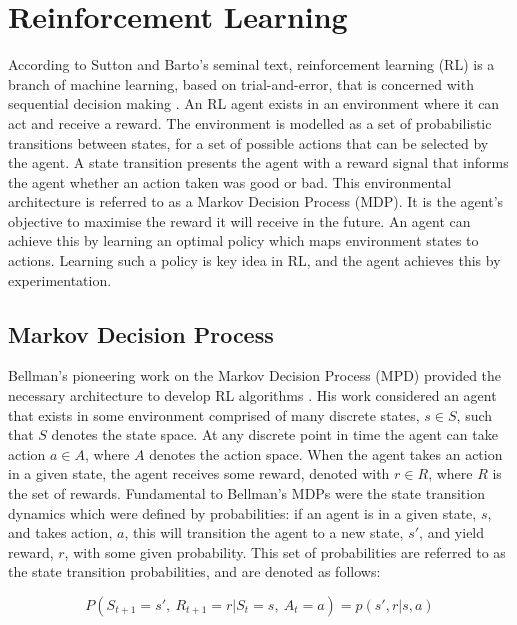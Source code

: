 \section{Reinforcement Learning}\label{rl}
According to Sutton and Barto's seminal text, reinforcement learning (RL) is a branch of machine learning, based on trial-and-error, that is concerned with sequential decision making \cite{Sutton2018}. An RL agent exists in an environment where it can act and receive a reward. The environment is modelled as a set of probabilistic transitions between states, for a set of possible actions that can be selected by the agent. A state transition presents the agent with a reward signal that informs the agent whether an action taken was good or bad. This environmental architecture is referred to as a Markov Decision Process (MDP). It is the agent's objective to maximise the reward it will receive in the future. An agent can achieve this by learning an optimal policy which maps environment states to actions. Learning such a policy is key idea in RL, and the agent achieves this by experimentation.


\subsection{Markov Decision Process}
Bellman's pioneering work on the Markov Decision Process (MPD) provided the necessary architecture to develop RL algorithms \cite{Bellm1957}. His work considered an agent that exists in some environment comprised of many discrete states, $s \in S$, such that $S$ denotes the state space. At any discrete point in time the agent can take action $a \in A$, where $A$ denotes the action space. When the agent takes an action in a given state, the agent receives some reward, denoted with $r \in R$, where $R$ is the set of rewards. Fundamental to Bellman's MDPs were the state transition dynamics which were defined by probabilities: if an agent is in a given state, $s$, and takes action, $a$, this will transition the agent to a new state, $s'$, and yield reward, $r$, with some given probability. This set of probabilities are referred to as the state transition probabilities, and are denoted as follows:

\begin{equation}
	P(S_{t+1} = s', \ R_{t+1} = r | S_t = s, \ A_t = a) = p(s', r | s, a) \label{eq:202}
\end{equation}

